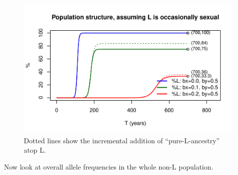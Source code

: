 \documentclass{article}\usepackage[]{graphicx}\usepackage[]{color}
\makeatletter
\def\maxwidth{ %
  \ifdim\Gin@nat@width>\linewidth
    \linewidth
  \else
    \Gin@nat@width
  \fi
}
\newenvironment{knitrout}{}{} %
\makeatother
\begin{document}
\begin{knitrout}
\begin{figure}
{\centering \includegraphics[width=\maxwidth]{asex-figs-knitr/unnamed-chunk-13-1} 

}

\caption[Dotted lines show the incremental addition of ``pure-L-ancestry'' atop L]{Dotted lines show the incremental addition of ``pure-L-ancestry'' atop L.}\label{fig:unnamed-chunk-13}
\end{figure}


\end{knitrout}

Now look at overall allele frequencies in the whole non-L population.
\end{document}
